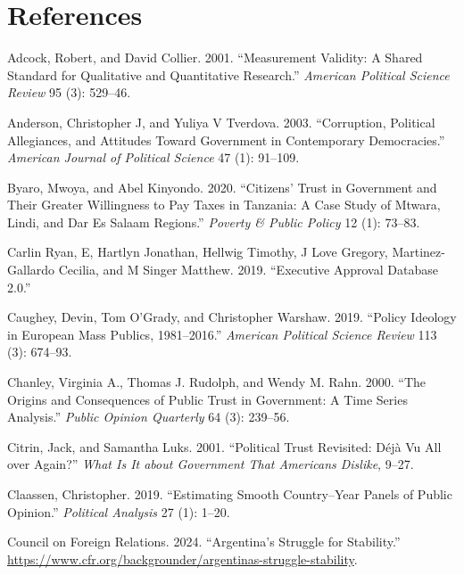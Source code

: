 \documentclass[
  12pt,
]{article}
\newlength{\cslhangindent}
\newenvironment{CSLReferences}[2] %
 {\begin{list}{}{%
  \setlength{\itemindent}{0pt}
  \setlength{\leftmargin}{0pt}
  \setlength{\parsep}{0pt}
  \ifodd #1
   \setlength{\leftmargin}{\cslhangindent}
   \setlength{\itemindent}{-1\cslhangindent}
  \fi
  \setlength{\itemsep}{#2\baselineskip}}}
 {\end{list}}
\begin{document}
\section*{References}\label{references}

\label{refs-text}
\begin{CSLReferences}{1}{0}
Adcock, Robert, and David Collier. 2001. {``Measurement Validity: A Shared Standard for Qualitative and Quantitative Research.''} \emph{American Political Science Review} 95 (3): 529--46.

Anderson, Christopher J, and Yuliya V Tverdova. 2003. {``Corruption, Political Allegiances, and Attitudes Toward Government in Contemporary Democracies.''} \emph{American Journal of Political Science} 47 (1): 91--109.

Byaro, Mwoya, and Abel Kinyondo. 2020. {``Citizens' Trust in Government and Their Greater Willingness to Pay Taxes in Tanzania: A Case Study of Mtwara, Lindi, and Dar Es Salaam Regions.''} \emph{Poverty \& Public Policy} 12 (1): 73--83.

Carlin Ryan, E, Hartlyn Jonathan, Hellwig Timothy, J Love Gregory, Martinez-Gallardo Cecilia, and M Singer Matthew. 2019. {``Executive Approval Database 2.0.''}

Caughey, Devin, Tom O'Grady, and Christopher Warshaw. 2019. {``Policy Ideology in European Mass Publics, 1981--2016.''} \emph{American Political Science Review} 113 (3): 674--93.

Chanley, Virginia A., Thomas J. Rudolph, and Wendy M. Rahn. 2000. {``The {Origins} and {Consequences} of {Public} {Trust} in {Government}: {A} {Time} {Series} {Analysis}.''} \emph{Public Opinion Quarterly} 64 (3): 239--56.

Citrin, Jack, and Samantha Luks. 2001. {``Political Trust Revisited: D{é}j{à} Vu All over Again?''} \emph{What Is It about Government That Americans Dislike}, 9--27.

Claassen, Christopher. 2019. {``Estimating Smooth Country--Year Panels of Public Opinion.''} \emph{Political Analysis} 27 (1): 1--20.

Council on Foreign Relations. 2024. {``Argentina's Struggle for Stability.''} \url{https://www.cfr.org/backgrounder/argentinas-struggle-stability}.


\end{CSLReferences}
\end{document}
